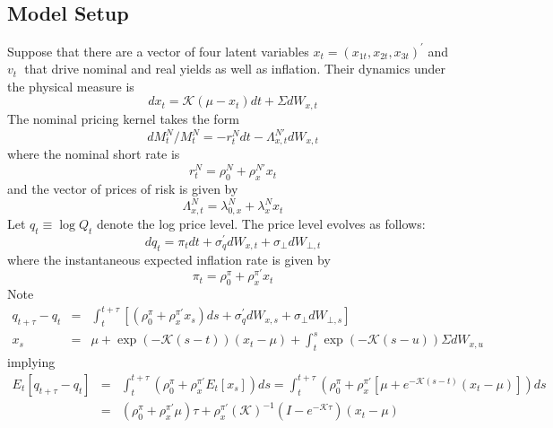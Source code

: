 \documentclass{article}
\begin{document}
\subsection{Model Setup}

Suppose that there are a vector of four latent variables $x_{t}=\left(
x_{1t},x_{2t},x_{3t}\right) ^{\prime }$ and $v_{t}$\textbf{\ }that drive
nominal and real yields as well as inflation. Their dynamics under the
physical measure is%
\begin{equation}
dx_{t}=\mathcal{K}\left( \mu -x_{t}\right) dt+\Sigma dW_{x,t}
\end{equation}%
The nominal pricing kernel takes the form%
\begin{equation}
dM_{t}^{N}/M_{t}^{N}=-r_{t}^{N}dt-\Lambda _{x,t}^{N\prime }dW_{x,t}
\end{equation}%
where the nominal short rate is%
\begin{equation}
r_{t}^{N}=\rho _{0}^{N}+\rho _{x}^{N\prime }x_{t}
\end{equation}%
and the vector of prices of risk is given by\qquad 
\begin{equation*}
\Lambda _{x,t}^{N}=\lambda _{0,x}^{N}+\lambda _{x}^{N}x_{t}
\end{equation*}%
Let $q_{t}\equiv \log Q_{t}$ denote the log price level. The price level
evolves as follows: 
\begin{equation}
dq_{t}=\pi _{t}dt+\sigma _{q}^{\prime }dW_{x,t}+\sigma _{\bot }dW_{\bot ,t}
\end{equation}%
where the instantaneous expected inflation rate is given by 
\begin{equation}
\pi _{t}=\rho _{0}^{\pi }+\rho _{x}^{\pi \prime }x_{t}
\end{equation}%
Note 
\begin{eqnarray*}
q_{t+\tau }-q_{t} &=&\int_{t}^{t+\tau }\left[ \left( \rho _{0}^{\pi }+\rho
_{x}^{\pi \prime }x_{s}\right) ds+\sigma _{q}^{\prime }dW_{x,s}+\sigma
_{\bot }dW_{\bot ,s}\right]  \\
x_{s} &=&\mu +\exp \left( -\mathcal{K}\left( s-t\right) \right) \left(
x_{t}-\mu \right) +\int_{t}^{s}\exp \left( -\mathcal{K}\left( s-u\right)
\right) \Sigma dW_{x,u}
\end{eqnarray*}%
implying%
\begin{eqnarray*}
E_{t}\left[ q_{t+\tau }-q_{t}\right]  &=&\int_{t}^{t+\tau }\left( \rho
_{0}^{\pi }+\rho _{x}^{\pi \prime }E_{t}\left[ x_{s}\right] \right)
ds=\int_{t}^{t+\tau }\left( \rho _{0}^{\pi }+\rho _{x}^{\pi \prime }\left[
\mu +e^{-\mathcal{K}\left( s-t\right) }\left( x_{t}-\mu \right) \right]
\right) ds \\
&=&\left( \rho _{0}^{\pi }+\rho _{x}^{\pi \prime }\mu \right) \tau +\rho
_{x}^{\pi \prime }\left( \mathcal{K}\right) ^{-1}\left( I-e^{-\mathcal{K}%
\tau }\right) \left( x_{t}-\mu \right) 
\end{eqnarray*}%
\end{document}
